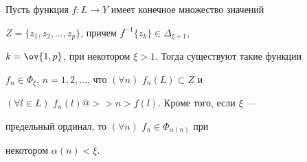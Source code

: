 \begin{lems} 


Пусть функция $f:L\to Y$ имеет конечное множество значений 


$Z=\{z_1,z_2,\dotsc,z_p\}$, причем $f^{-1}\{z_k\}\in \Delta_{\xi+1}$, 


$k=\ov{1,p}$, при некотором $\xi>1$. Тогда существуют такие функции 


$f_n\in\Phi_\xi$, $n=1,2,\dotsc$, что $(\forall n)$ $f_n(L)\subset Z$ и 


$(\forall l\in L)$ $f_n(l)@>>n>f(l)$. Кроме того, если $\xi$ --- 


предельный ординал, то $(\forall n)$ $f_n\in\Phi_{\alpha(n)}$ при 


некотором $\alpha(n)<\xi$. 


\end{lems} 


 


